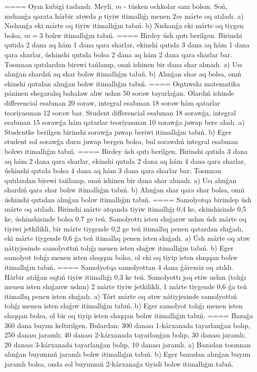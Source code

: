 ====
Oyın kubigi taslandı. Meyli, $m$ - túsken ochkolar sanı bolsın. Soń, nıshanǵa qarata hárbir atıwda $p$ tiyiw itimallıǵı menen $2m$ márte oq atıladı. a) Nıshanǵa eki márte oq tiyiw itimallıǵın tabıń. b) Nıshanǵa eki márte oq tiygen bolsa, $m=3$ bolıw itimallıǵın tabıń.
====
Birdey úsh qutı berilgen. Birinshi qutıda 2 dana aq hám 1 dana qara sharlar, ekinshi qutıda 3 dana aq hám 1 dana qara sharlar, úshinshi qutıda bolsa 2 dana aq hám 2 dana qara sharlar bar. Tosınnan qutılardan birewi tańlanıp, onıń ishinen bir dana shar alınadı. a) Usı alınǵan shardıń aq shar bolıw itimallıǵın tabıń. b) Alınǵan shar aq bolsa, onıń ekinshi qutıdan alınǵan bolıw itimallıǵın tabıń.
====
Oqıtıwshı matematika páninen shegaralıq bahalaw alıw ushın 50 soraw tayarlaǵan. Olardıń ishinde differencial esabınan 20 soraw, integral esabınan 18 soraw hám qatarlar teoriyasınan 12 soraw bar. Student differencial esabınan 18 sorawǵa, integral esabınan 15 sorawǵa hám qatarlar teoriyasınan 10 sorawǵa juwap bere aladı. a) Studentke berilgen birinshi sorawǵa juwap beriwi itimallıǵın tabıń. b) Eger student sol sorawǵa durıs juwap bergen bolsa, bul sorawdıń integral esabınan bolıwı itimallıǵın tabıń.
====
Birdey úsh qutı berilgen. Birinshi qutıda 3 dana aq hám 2 dana qara sharlar, ekinshi qutıda 2 dana aq hám 4 dana qara sharlar, úshinshi qutıda bolsa 4 dana aq hám 3 dana qara sharlar bar. Tosınnan qutılardan birewi tańlanıp, onıń ishinen bir dana shar alınadı. a) Usı alınǵan shardıń qara shar bolıw itimallıǵın tabıń. b) Alınǵan shar qara shar bolsa, onıń úshinshi qutıdan alınǵan bolıw itimallıǵın tabıń.
====
Samolyotqa birimlep úsh márte oq atıladı. Birinshi márte atqanda tiyiw itimallıǵı 0,4 ke, ekinshisinde 0,5 ke, úshinshisinde bolsa 0,7 ge teń. Samolyottı isten shıǵarıw ushın úsh márte oq tiyiwi jetkilikli, bir márte tiygende 0,2 ge teń itimallıq penen qatardan shıǵadı, eki márte tiygende 0,6 ǵa teń itimallıq penen isten shıǵadı. 
a) Úsh márte oq atıw nátiyjesinde samolyottıń tolıǵı menen isten shıǵıw itimallıǵın tabıń. b) Eger samolyot tolıǵı menen isten shıqqan bolsa, ol eki oq tiyip isten shıqqan bolıw itimallıǵın tabıń.
====
Samolyotqa samolyottan 4 dana ǵárezsiz oq atıldı. Hárbir atılǵan oqtıń tiyiw itimallıǵı 0,3 ke teń. Samolyottı joq etiw ushın (tolıǵı menen isten shıǵarıw ushın) 2 márte tiyiw jetkilikli, 1 márte tiygende 0,6 ǵa teń itimallıq penen isten shıǵadı. a) Tórt márte oq atıw nátiyjesinde samolyottıń tolıǵı menen isten shıǵıw itimallıǵın tabıń. b) Eger samolyot tolıǵı menen isten shıqqan bolsa, ol bir oq tiyip isten shıqqan bolıw itimallıǵın tabıń.
====
Bazaǵa 360 dana buyım keltirilgen. Bulardan: 300 danası 1-kárxanada tayarlanǵan bolıp, 250 danası jaramlı; 40 danası 2-kárxanada tayarlanǵan bolıp, 30 danası jaramlı; 20 danası 3-kárxanada tayarlanǵan bolıp, 10 danası jaramlı. a) Bazadan tosınnan alınǵan buyımnıń jaramlı bolıw itimallıǵın tabıń. b) Eger bazadan alınǵan buyım jaramlı bolsa, onda sol buyımnıń 2-kárxanaǵa tiyisli bolıw itimallıǵın tabıń.
